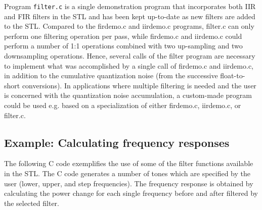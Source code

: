 Program {\tt filter.c} is a single demonstration program that incorporates both
IIR and FIR filters in the STL and has been kept up-to-date as new
filters are added to the STL. Compared to the firdemo.c and iirdemo.c
programs, filter.c can only perform one filtering operation per
pass, while firdemo.c and iirdemo.c could perform a number of 1:1
operations combined with two up-sampling and two downsampling
operations. Hence, several calls of the filter program are necessary
to implement what was accomplished by a single call of firdemo.c and
iirdemo.c, in addition to the cumulative quantization noise (from the
successive float-to-short conversions). In applications where multiple
filtering is needed and the user is concerned with the quantization
noise accumulation, a custom-made program could be used e.g. based on
a specialization of either firdemo.c, iirdemo.c, or filter.c.

\subsection {Example: Calculating frequency responses}

The following C code exemplifies the use of some of the filter
functions available in the STL. The C code generates a number of tones
which are specified by the user (lower, upper, and step frequencies).
The frequency response is obtained by calculating the power change for
each single frequency before and after filtered by the selected
filter.

